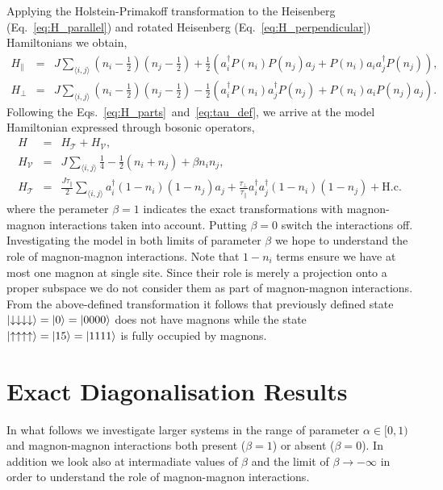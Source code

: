 \documentclass[12pt, a4paper]{article}
\newcommand{\mean}[1]{\langle#1\rangle}
\begin{document}
Applying the Holstein-Primakoff transformation to the Heisenberg (Eq.~\ref{eq:H_parallel}) and rotated Heisenberg (Eq.~\ref{eq:H_perpendicular}) Hamiltonians we obtain,
\begin{eqnarray}
	H_{\parallel} &=& J\sum_{\mean{i,j}} \left(n_i - \frac{1}{2}\right) \left(n_j - \frac{1}{2}\right) + \frac{1}{2}\left(a_i^\dagger P(n_i) P(n_j) a_j + P(n_i) a_i a_j^\dagger P(n_j)\right), \\
	H_{\perp} &=& J\sum_{\mean{i,j}} \left(n_i - \frac{1}{2}\right) \left(n_j - \frac{1}{2}\right) - \frac{1}{2}\left(a_i^\dagger P(n_i) a_j^\dagger P(n_j) + P(n_i) a_i P(n_j) a_j\right).
\end{eqnarray}
Following the Eqs.~\ref{eq:H_parts}~and~\ref{eq:tau_def}, we arrive at the model Hamiltonian expressed through bosonic operators,
\begin{eqnarray}\label{eq:H_bosonic}
	H &=& H_{\mathcal{T}} + H_{\mathcal{V}}, \\
	H_{\mathcal{V}} &=& J\sum_{\mean{i,j}} \frac{1}{4} - \frac{1}{2}\left(n_i + n_j\right) + \beta n_i n_j, \\
	H_{\mathcal{T}} &=& \frac{J\tau_{\parallel}}{2} \sum_{\mean{i,j}} a_i^\dagger (1-n_i)(1-n_j)a_j + \frac{\tau_{\perp}}{\tau_{\parallel}} a_i^\dagger a_j^\dagger (1-n_i) (1-n_j) + \text{H.c.}
\end{eqnarray}
where the perameter $\beta = 1$ indicates the exact transformations with magnon-magnon interactions taken into account. Putting $\beta = 0$ switch the interactions off. Investigating the model in both limits of parameter $\beta$ we hope to understand the role of magnon-magnon interactions. Note that $1-n_i$ terms ensure we have at most one magnon at single site. Since their role is merely a projection onto a proper subspace we do not consider them as part of magnon-magnon interactions. From the above-defined transformation it follows that previously defined state $\ket{\downarrow\downarrow\downarrow\downarrow} = \ket{0} = \ket{0 0 0 0}$ does not have magnons while the state $\ket{\uparrow\uparrow\uparrow\uparrow} = \ket{15} = \ket{1 1 1 1}$ is fully occupied by magnons.

\section{Exact Diagonalisation Results}\label{sec:ed_results}
In what follows we investigate larger systems in the range of parameter $\alpha \in [0, 1)$ and magnon-magnon interactions both present ($\beta = 1$) or absent ($\beta = 0$). In addition we look also at intermadiate values of $\beta$ and the limit of $\beta \to -\infty$ in order to understand the role of magnon-magnon interactions.
\end{document}
